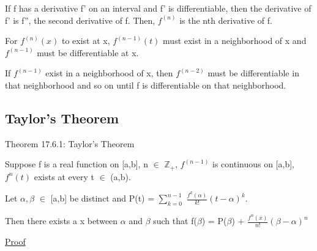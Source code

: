     \begin{adjustbox}{minipage=14cm, right, vspace=0.1cm 0cm}
        If f has a derivative f' on an interval and f' is differentiable,
        then the derivative of f' is f'', the second derivative of f.
        Then, $f^{(n)}$ is the nth derivative of f.

        For $f^{(n)}(x)$ to exist at x, $f^{(n-1)}(t)$ must exist
        in a neighborhood of x and $f^{(n-1)}$ must be differentiable at x.
        
        If $f^{(n-1)}$ exist in a neighborhood of x, then $f^{(n-2)}$
        must be differentiable in that neighborhood and
        so on until f is differentiable on that neighborhood.
    \end{adjustbox}

\newpage





\subsection{ Taylor's Theorem }

{ \color{red} Theorem 17.6.1: Taylor's Theorem }

    \begin{adjustbox}{minipage=14cm, right, vspace=0.1cm 0cm}
        Suppose f is a real function on [a,b], n $\in$ $\mathbb{Z}_+$,
        $f^{(n-1)}$ is continuous on [a,b], $f^n(t)$ exists at every t $\in$ (a,b).
        
        Let $\alpha,\beta$ $\in$ [a,b] be distinct and
        P(t) = $\sum_{k=0}^{n-1}$ $\frac{f^k(\alpha)}{k!} (t-\alpha)^k$.

        Then there exists a x between $\alpha$ and $\beta$ such that
        f($\beta$) = P($\beta$) + $\frac{f^n(x)}{n!} (\beta-\alpha)^n$
    \end{adjustbox}

{ \color{magenta} \underline{Proof} }

